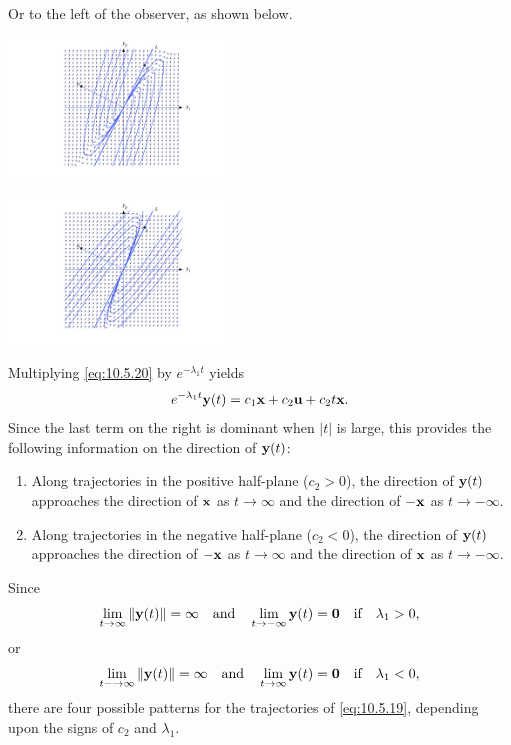 \documentclass{ximera}
\begin{document}
Or to the left of the observer, as shown below.

\begin{image}
 \includegraphics[height=1.5in]{fig100503.jpg} 
\end{image}

\begin{image}
 \includegraphics[height=1.5in]{fig100504.jpg} 
\end{image}

Multiplying \eqref{eq:10.5.20} by $e^{-\lambda_1t}$ yields
$$
e^{-\lambda_1t}{\bf y}(t)=c_1{\bf x}+c_2{\bf u}+c_2t
{\bf x}.
$$
Since the last term on the right is dominant when $|t|$ is large,
this provides the following information on the direction of ${\bf
y}(t)$:
\begin{enumerate}
\item %
Along trajectories in the positive half-plane ($c_2>0$), the direction
of ${\bf y}(t)$ approaches the direction of ${\bf x}$ as $t\rightarrow\infty$
and the direction of $-{\bf x}$ as $t\rightarrow-\infty$.
\item %
Along trajectories in the negative half-plane ($c_2<0$), the direction
of ${\bf y}(t)$ approaches the direction of $-{\bf x}$ as $t\rightarrow\infty$
and the direction of ${\bf x}$ as $t\rightarrow-\infty$.
\end{enumerate}

Since
$$
\lim_{t\rightarrow\infty}\|{\bf y}(t)\|=\infty\quad\mbox{and}\quad
\lim_{t\rightarrow-\infty}{\bf y}(t)={\bf 0}\quad\mbox{if}\quad\lambda_1>0,
$$
or
$$
\lim_{t-\rightarrow\infty}\|{\bf y}(t)\|=\infty\quad\mbox{and}\quad
\lim_{t\rightarrow\infty}{\bf y}(t)={\bf 0}\quad\mbox{if}\quad\lambda_1<0,
$$
 there are four possible patterns for the trajectories
of \eqref{eq:10.5.19}, depending upon the signs of $c_2$ and $\lambda_1$.
\end{document}

